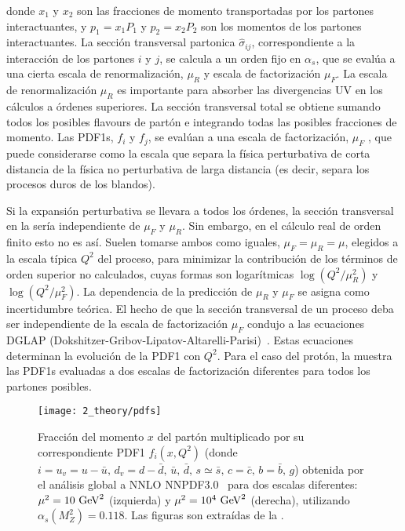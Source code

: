 donde \(x_1\) y \(x_2\) son las fracciones de momento transportadas por los partones interactuantes, y \(p_1 = x_1 P_1\) y \(p_2 = x_2 P_2\) son los momentos de los partones interactuantes. La sección transversal partonica \(\hat{\sigma}_{ij}\), correspondiente a la interacción de los partones \(i\) y \(j\), se calcula a un orden fijo en \(\alpha_s\), que se evalúa a una cierta escala de renormalización, \(\mu_R\) y escala de factorización \(\mu_F\). La escala de renormalización \(\mu_R\) es importante para absorber las divergencias \ac{UV} en los cálculos a órdenes superiores. La sección transversal total se obtiene sumando todos los posibles flavours de part\'on e integrando todas las posibles fracciones de momento. Las \acp{PDF1}, \(f_i\) y \(f_j\), se evalúan a una escala de factorización, \(\mu_F\) , que puede considerarse como la escala que separa la física perturbativa de corta distancia de la física no perturbativa de larga distancia (es decir, separa los procesos duros de los blandos).

Si la expansión perturbativa se llevara a todos los órdenes, la sección transversal en la \Eqn{\ref{eq:theory:sm:hadron_interactions:xs}} sería independiente de \(\mu_F\) y \(\mu_R\). Sin embargo, en el cálculo real de orden finito esto no es así. Suelen tomarse ambos como iguales, \(\mu_F = \mu_R = \mu\), elegidos a la escala típica \(Q^2\) del proceso, para minimizar la contribución de los términos de orden superior no calculados, cuyas formas son logarítmicas \(\log\left(Q^2/\mu_R^2\right)\) y \(\log\left(Q^2/\mu_F^2\right)\). La dependencia de la predicción de \(\mu_R\) y \(\mu_F\) se asigna como incertidumbre teórica. El hecho de que la sección transversal de un proceso deba ser independiente de la escala de factorización \(\mu_F\) condujo a las ecuaciones DGLAP (Dokshitzer-Gribov-Lipatov-Altarelli-Parisi)~\cite{Dokshitzer-1977,Gribov_Lipatov-1971,Altarelli_Parisi-1977}. Estas ecuaciones determinan la evolución de la \ac{PDF1} con \(Q^2\).
Para el caso del protón, la \Fig{\ref{fig:theory:sm:hadron_interactions:pdfs}} muestra las \acp{PDF1} evaluadas a dos escalas de factorización diferentes para todos los partones posibles.

\begin{figure}[ht!]
    \centering
    \texttt{[image: 2\_theory/pdfs]}
    \caption{Fracci\'on del momento \(x\) del part\'on multiplicado por su correspondiente \acs{PDF1} \(f_i(x, Q^2)\) (donde \(i = u_v = u - \bar{u}, \, d_v = d - \bar{d},\, \bar{u},\, \bar{d},\, s\simeq\bar{s},\, c=\bar{c},\, b=\bar{b},\, g \)) obtenida por el an\'alisis global a \ac{NNLO} NNPDF3.0~\cite{NNPDF} para dos escalas diferentes: \(\mu^2 = 10~\text{GeV}^2\) (izquierda) y \(\mu^2 = 10^4~\text{GeV}^2\) (derecha), utilizando \(\alpha_s(M_Z^2) = 0.118\). Las figuras son extra\'idas de la .}
    \label{fig:theory:sm:hadron_interactions:pdfs}
\end{figure}





